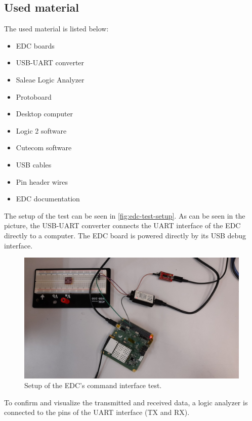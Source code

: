 \subsection{Used material}

The used material is listed below:

\begin{itemize}
    \item EDC boards
    \item USB-UART converter
    \item Saleae Logic Analyzer
    \item Protoboard
    \item Desktop computer
    \item Logic 2 software
    \item Cutecom software
    \item USB cables
    \item Pin header wires
    \item EDC documentation
\end{itemize}

The setup of the test can be seen in \autoref{fig:edc-test-setup}. As can be seen in the picture, the USB-UART converter connects the UART interface of the EDC directly to a computer. The EDC board is powered directly by its USB debug interface.

\begin{figure}[!ht]
    \begin{center}
        \includegraphics[width=\textwidth]{figures/edc_report/cmd-test-setup}
        \caption{Setup of the EDC's command interface test.}
        \label{fig:edc-test-setup}
    \end{center}
\end{figure}

To confirm and visualize the transmitted and received data, a logic analyzer is connected to the pins of the UART interface (TX and RX).

